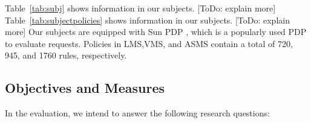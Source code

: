 Table~\ref{tab:subj} shows information in our subjects. [ToDo: explain more]
Table~\ref{tab:subjectpolicies} shows information in our subjects. [ToDo: explain more]
Our subjects are equipped with Sun PDP \cite{sunxacml}, which is
a popularly used PDP to evaluate requests.
Policies in LMS,VMS, and ASMS contain a total of 720, 945, and 1760 rules, respectively.
 


\subsection{Objectives and Measures}
In the evaluation, we intend to answer the following
research questions:
